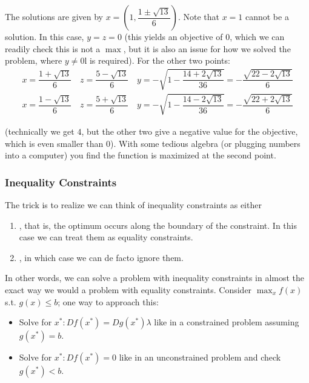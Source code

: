 \documentclass{article}
\begin{document}
\begin{example}
  The solutions are given by $x = \left(1, \dfrac{1 \pm \sqrt{13}}{6}\right)$. Note that $x = 1$ cannot be a solution. In this case, $y = z = 0$ (this yields an objective of $0$, which we can readily check this is not a $\max$, but it is also an issue for how we solved the problem, where $y \ne 0$l is required). For the other two points:
  \begin{align*}
    x = \dfrac{1 + \sqrt{13}}{6}
    \quad
    z = \dfrac{5 - \sqrt{13}}{6}
    \quad
    y
    = - \sqrt{1 - \dfrac{14 + 2 \sqrt{13}}{36}}
    = - \dfrac{\sqrt{22 - 2 \sqrt{13}}}{6}
    \\
    x = \dfrac{1 - \sqrt{13}}{6}
    \quad
    z = \dfrac{5 + \sqrt{13}}{6}
    \quad
    y
    = - \sqrt{1 - \dfrac{14 - 2 \sqrt{13}}{36}}
    = - \dfrac{\sqrt{22 + 2 \sqrt{13}}}{6}
  \end{align*}

  (technically we get $4$, but the other two give a negative value for the objective, which is even smaller than $0$). With some tedious algebra (or plugging numbers into a computer) you find the function is maximized at the second point.
\end{example}

\subsubsection{Inequality Constraints}
\label{ssub:inequality_constraints}

The trick is to realize we can think of inequality constraints as either
\begin{enumerate}
  \item {}, that is, the optimum occurs along the boundary of the constraint. In this case we can treat them as equality constraints.

  \item {}, in which case we can de facto ignore them.
\end{enumerate}

In other words, we can solve a problem with inequality constraints in almost the exact way we would a problem with equality constraints. Consider $\max_x f(x)$ s.t. $g(x) \le b$; one way to approach this:
\begin{itemize}[label=$\bullet$]
  \item Solve for $x^*: D f(x^*) = D g(x^*) \lambda$ like in a constrained problem assuming $g(x^*) = b$.
  \item Solve for $x^*: D f(x^*) = 0$ like in an unconstrained problem and check $g(x^*) < b$.
\end{itemize}
\end{document}
